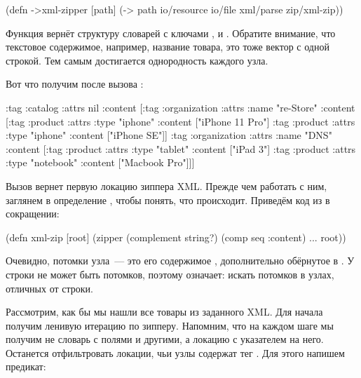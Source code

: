 \begin{english}
  \begin{clojure}
(defn ->xml-zipper [path]
  (-> path
      io/resource
      io/file
      xml/parse
      zip/xml-zip))
  \end{clojure}
\end{english}

Функция  вернёт структуру словарей с ключами ,  и
. Обратите внимание, что текстовое содержимое, например, название
товара, это тоже вектор с одной строкой. Тем самым достигается однородность
каждого узла.

Вот что получим после вызова :

\begin{english}
  \begin{clojure}
{:tag :catalog
 :attrs nil
 :content
 [{:tag :organization
   :attrs {:name "re-Store"}
   :content
   [{:tag :product
     :attrs {:type "iphone"}
     :content ["iPhone 11 Pro"]}
    {:tag :product
     :attrs {:type "iphone"}
     :content ["iPhone SE"]}]}
  {:tag :organization
   :attrs {:name "DNS"}
   :content
   [{:tag :product
     :attrs {:type "tablet"}
     :content ["iPad 3"]}
    {:tag :product
     :attrs {:type "notebook"}
     :content ["Macbook Pro"]}]}]}
  \end{clojure}
\end{english}

Вызов  вернет первую локацию зиппера XML. Прежде
чем работать с ним, заглянем в определение , чтобы понять, что
происходит. Приведём код из  в сокращении:

\begin{english}
  \begin{clojure}
(defn xml-zip
  [root]
  (zipper (complement string?)
          (comp seq :content)
          ...
          root))
  \end{clojure}
\end{english}

Очевидно, потомки узла~--- это его содержимое , дополнительно обёрнутое
в . У строки не может быть потомков, поэтому 
означает: искать потомков в узлах, отличных от строки.

Рассмотрим, как бы мы нашли все товары из заданного XML. Для начала получим
ленивую итерацию по зипперу. Напомним, что на каждом шаге мы получим не словарь
с полями  и другими, а локацию с указателем на него. Останется
отфильтровать локации, чьи узлы содержат тег . Для этого напишем
предикат:

